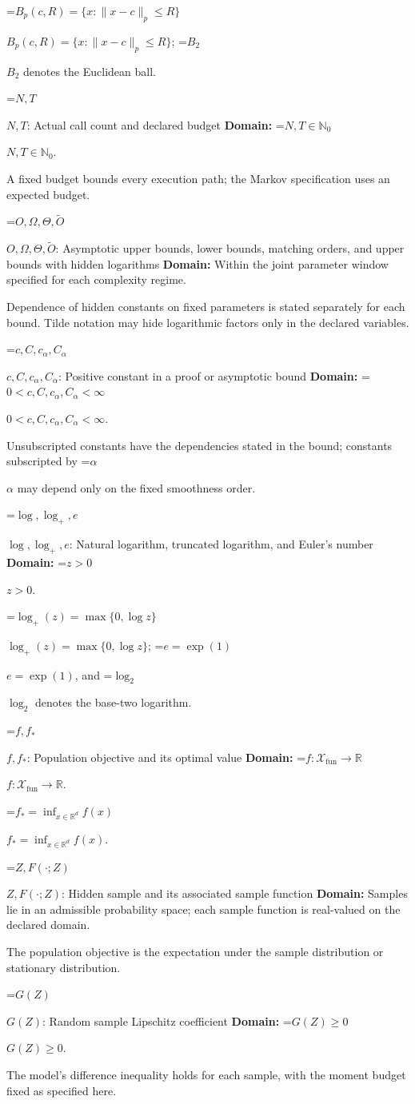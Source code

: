 \documentclass[10pt,a4paper]{article}
\newcommand{\AtlasMath}[1]{\par\begingroup\centering\setbox0=\hbox{$\displaystyle #1$}\ifdim\wd0>1.4\linewidth\typeout{ATLAS WIDE FORMULA: \the\wd0}\fi\ifdim\wd0>\linewidth\resizebox{\linewidth}{!}{\box0}\else\box0\fi\par\endgroup}
\newcommand{\AtlasInlineMath}[1]{\begingroup\setbox0=\hbox{$#1$}\ifdim\wd0>.4\linewidth\endgroup\AtlasMath{#1}\else\endgroup$#1$\fi}
\begin{document}
\AtlasInlineMath{B_p(c,R)=\{x:\|x-c\|_p\le R\}}; \AtlasInlineMath{B_2} denotes the Euclidean ball.

\AtlasInlineMath{N,T}: Actual call count and declared budget \textbf{Domain:} \AtlasInlineMath{N,T\in\mathbb{N}_0}.

A fixed budget bounds every execution path; the Markov specification uses an expected budget.

\AtlasInlineMath{O,\Omega,\Theta,\widetilde{O}}: Asymptotic upper bounds, lower bounds, matching orders, and upper bounds with hidden logarithms \textbf{Domain:} Within the joint parameter window specified for each complexity regime.

Dependence of hidden constants on fixed parameters is stated separately for each bound. Tilde notation may hide logarithmic factors only in the declared variables.

\AtlasInlineMath{c,C,c_\alpha,C_\alpha}: Positive constant in a proof or asymptotic bound \textbf{Domain:} \AtlasInlineMath{0<c,C,c_\alpha,C_\alpha<\infty}.

Unsubscripted constants have the dependencies stated in the bound; constants subscripted by \AtlasInlineMath{\alpha} may depend only on the fixed smoothness order.

\AtlasInlineMath{\log,\log_+,e}: Natural logarithm, truncated logarithm, and Euler's number \textbf{Domain:} \AtlasInlineMath{z>0}.

\AtlasInlineMath{\log_+(z)=\max\{0,\log z\}}; \AtlasInlineMath{e=\exp(1)}, and \AtlasInlineMath{\log_2} denotes the base-two logarithm.

\AtlasInlineMath{f,f_*}: Population objective and its optimal value \textbf{Domain:} \AtlasInlineMath{f:\mathcal{X}_{\mathrm{fun}}\to\mathbb{R}}.

\AtlasInlineMath{f_*=\inf_{x\in \mathbb{R}^d}f(x)}.

\AtlasInlineMath{Z,F(\cdot;Z)}: Hidden sample and its associated sample function \textbf{Domain:} Samples lie in an admissible probability space; each sample function is real-valued on the declared domain.

The population objective is the expectation under the sample distribution or stationary distribution.

\AtlasInlineMath{G(Z)}: Random sample Lipschitz coefficient \textbf{Domain:} \AtlasInlineMath{G(Z)\ge0}.

The model's difference inequality holds for each sample, with the moment budget fixed as specified here.
\end{document}
